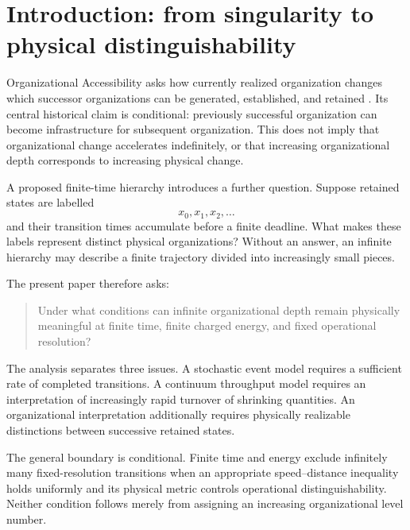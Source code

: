 \documentclass[11pt,a4paper]{article}
\theoremstyle{definition}
\numberwithin{equation}{section}
\begin{document}
\begin{abstract}
These are conditional physical boundaries, not a universal prohibition of
singular dynamics. The remaining challenge is constructive: any proposed
finite-time infinite-depth system must expose how it creates unbounded
operational packing capacity, evades the dynamical-resource bound, or leaves
the stated model class.
\end{abstract}


\section{Introduction: from singularity to physical distinguishability}

Organizational Accessibility asks how currently realized organization
changes which successor organizations can be generated, established,
and retained \cite{OA8}. Its central historical claim is conditional:
previously successful organization can become infrastructure for
subsequent organization. This does not imply that organizational
change accelerates indefinitely, or that increasing organizational
depth corresponds to increasing physical change.

A proposed finite-time hierarchy introduces a further question.
Suppose retained states are labelled
\[
x_0,x_1,x_2,\ldots
\]
and their transition times accumulate before a finite deadline.
What makes these labels represent distinct physical organizations?
Without an answer, an infinite hierarchy may describe a finite
trajectory divided into increasingly small pieces.

The present paper therefore asks:
\begin{quote}
Under what conditions can infinite organizational depth remain
physically meaningful at finite time, finite charged energy, and fixed
operational resolution?
\end{quote}

The analysis separates three issues. A stochastic event model requires
a sufficient rate of completed transitions. A continuum throughput model
requires an interpretation of increasingly rapid turnover of shrinking
quantities. An organizational interpretation additionally requires
physically realizable distinctions between successive retained states.

The general boundary is conditional. Finite time and energy exclude
infinitely many fixed-resolution transitions when an appropriate
speed--distance inequality holds uniformly and its physical metric
controls operational distinguishability. Neither condition follows
merely from assigning an increasing organizational level number.
\end{document}
